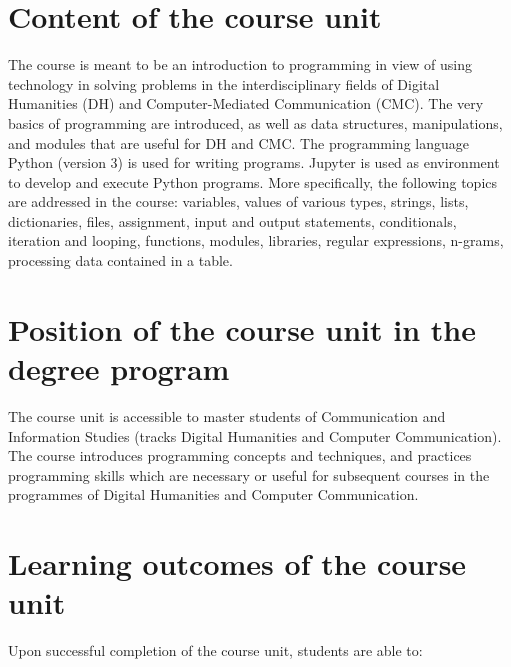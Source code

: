 \documentclass[a4paper,12pt]{article}
\begin{document}
\section{Content of the course unit}

The course is meant to be an introduction to programming in view of using
technology in solving problems in the interdisciplinary fields of Digital
Humanities (DH) and Computer-Mediated Communication (CMC). The very basics of
programming are introduced, as well as data structures, manipulations, and
modules that are useful for DH and CMC. The programming language Python
(version 3) is used for writing programs. Jupyter is used as environment to
develop and execute Python programs. More specifically, the following topics
are addressed in the course: variables, values of various types, strings,
lists, dictionaries, files, assignment, input and output statements,
conditionals, iteration and looping, functions, modules, libraries, regular
expressions, n-grams, processing data contained in a table.

\section{Position of the course unit in the degree program}
The course unit is accessible to master students of Communication and
Information Studies (tracks Digital Humanities and Computer Communication).
The course introduces programming concepts and techniques, and practices
programming skills which are necessary or useful for subsequent courses in the
programmes of Digital Humanities and Computer Communication.

\section{Learning outcomes of the course unit}

Upon successful completion of the course unit, students are able to:

\end{document}
